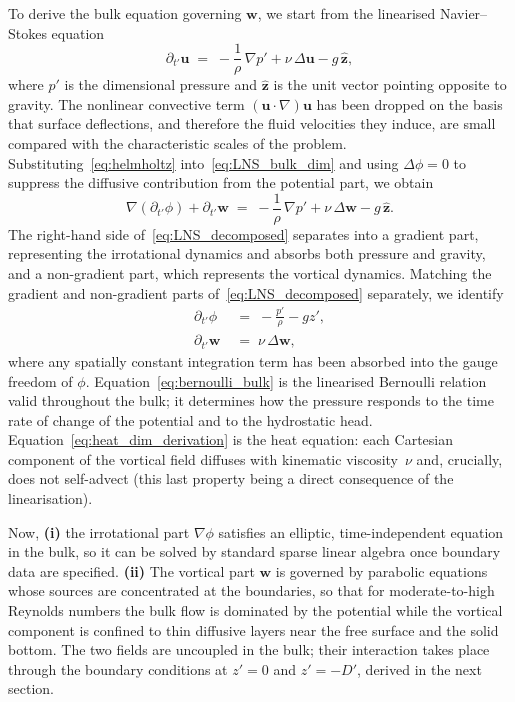 \documentclass{article}
\newcommand{\uu}{\mathbf{u}}
\newcommand{\ww}{\mathbf{w}}
\begin{document}
To derive the bulk equation governing $\ww$, we start from the linearised Navier--Stokes equation
\begin{equation}
    \partial_{t'}\uu \;=\; -\frac{1}{\rho}\,\nabla p' + \nu\,\Delta\uu - g\,\hat{\bm{z}}, \label{eq:LNS_bulk_dim}
\end{equation}
where $p'$ is the dimensional pressure and $\hat{\bm{z}}$ is the unit vector pointing opposite to gravity.
The nonlinear convective term $(\uu\cdot\nabla)\uu$ has been dropped on the basis that surface deflections, and therefore the fluid velocities they induce, are small compared with the characteristic scales of the problem.
Substituting~\eqref{eq:helmholtz} into~\eqref{eq:LNS_bulk_dim} and using $\Delta\phi = 0$ to suppress the diffusive contribution from the potential part, we obtain
\begin{equation}
    \nabla(\partial_{t'}\phi) + \partial_{t'}\ww \;=\; -\frac{1}{\rho}\,\nabla p' + \nu\,\Delta\ww - g\,\hat{\bm{z}}. \label{eq:LNS_decomposed}
\end{equation}
The right-hand side of~\eqref{eq:LNS_decomposed} separates into a gradient part, representing the irrotational dynamics and absorbs both pressure and gravity, and a non-gradient part, which represents the vortical dynamics.
Matching the gradient and non-gradient parts of~\eqref{eq:LNS_decomposed} separately, we identify
\begin{align}
    \partial_{t'}\phi \;&=\; -\frac{p'}{\rho} - g z', \label{eq:bernoulli_bulk} \\
    \partial_{t'}\ww \;&=\; \nu\,\Delta\ww, \label{eq:heat_dim_derivation}
\end{align}
where any spatially constant integration term has been absorbed into the gauge freedom of $\phi$.
Equation~\eqref{eq:bernoulli_bulk} is the linearised Bernoulli relation valid throughout the bulk; it determines how the pressure responds to the time rate of change of the potential and to the hydrostatic head.
\color{black}
Equation~\eqref{eq:heat_dim_derivation} is the heat equation: each Cartesian component of the vortical field diffuses with kinematic viscosity~$\nu$ and, crucially, does not self-advect (this last property being a direct consequence of the linearisation).

Now, \textbf{(i)} the irrotational part $\nabla\phi$ satisfies an elliptic, time-independent equation in the bulk, so it can be solved by standard sparse linear algebra once boundary data are specified.
\textbf{(ii)} The vortical part $\ww$ is governed by parabolic equations whose sources are concentrated at the boundaries, so that for moderate-to-high Reynolds numbers the bulk flow is dominated by the potential while the vortical component is confined to thin diffusive layers near the free surface and the solid bottom.
The two fields are uncoupled in the bulk; their interaction takes place through the boundary conditions at $z' = 0$ and $z' = -D'$, derived in the next section.
\color{blue}
\end{document}
